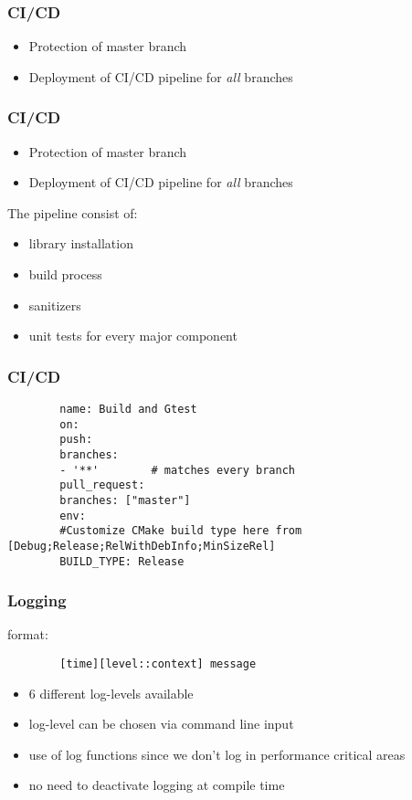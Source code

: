 \begin{frame}
	\frametitle{CI/CD}
	\large
	\begin{itemize}
		\item<1-> Protection of master branch
		\item<2-> Deployment of CI/CD pipeline for \textit{all} branches 
	\end{itemize}
	
\end{frame}


\begin{frame}
	\frametitle{CI/CD}
	\large
	\begin{itemize}
		\item Protection of master branch
		\item Deployment of CI/CD pipeline for \textit{all} branches 
	\end{itemize}
	\Large
	The pipeline consist of:
	\large
	\begin{itemize}
		\item<1-> library installation
		\item<2-> build process
		\item<3-> sanitizers
		\item<4-> unit tests for every major component
	\end{itemize}
\end{frame}

\begin{frame}[fragile]
	\frametitle{CI/CD}
	\begin{lstlisting}
		name: Build and Gtest
		on:
		push:
		branches:
		- '**'        # matches every branch
		pull_request:
		branches: ["master"]
		env:
		#Customize CMake build type here from [Debug;Release;RelWithDebInfo;MinSizeRel]
		BUILD_TYPE: Release	
	\end{lstlisting}
\end{frame}

\begin{frame}[fragile]
	\frametitle{Logging}
	\large
	format:
	\begin{lstlisting}
		[time][level::context] message
	\end{lstlisting}
	
	
	\begin{itemize}
		\item 6 different log-levels available
		\item log-level can be chosen via command line input
		\item use of log functions since we don't log in performance critical areas
		\item no need to deactivate logging at compile time
	\end{itemize}
\end{frame}

